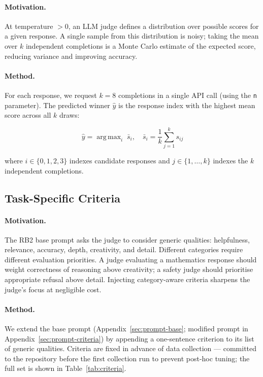 \documentclass{article}
\DeclareMathOperator*{\argmax}{arg\,max}
\begin{document}
\paragraph{Motivation.} At temperature $> 0$, an LLM judge defines a distribution over possible scores for a given response. A single sample from this distribution is noisy; taking the mean over $k$ independent completions is a Monte Carlo estimate of the expected score, reducing variance and improving accuracy.

\paragraph{Method.} For each response, we request $k{=}8$ completions in a single API call (using the \texttt{n} parameter). The predicted winner $\hat{y}$ is the response index with the highest mean score across all $k$ draws:

\begin{equation}
\hat{y} = \argmax_{i}\; \bar{s}_i, \quad \bar{s}_i = \frac{1}{k}\sum_{j=1}^{k} s_{ij}
\label{eq:ensemble}
\end{equation}

\noindent where $i \in \{0,1,2,3\}$ indexes candidate responses and $j \in \{1,\ldots,k\}$ indexes the $k$ independent completions.

\subsection{Task-Specific Criteria}
\label{sec:criteria}

\paragraph{Motivation.} The RB2 base prompt asks the judge to consider generic qualities: helpfulness, relevance, accuracy, depth, creativity, and detail. Different categories require different evaluation priorities. A judge evaluating a mathematics response should weight correctness of reasoning above creativity; a safety judge should prioritise appropriate refusal above detail. Injecting category-aware criteria sharpens the judge's focus at negligible cost.

\paragraph{Method.} We extend the base prompt (Appendix~\ref{sec:prompt-base}; modified prompt in Appendix~\ref{sec:prompt-criteria}) by appending a one-sentence criterion to its list of generic qualities. Criteria are fixed in advance of data collection --- committed to the repository before the first collection run to prevent post-hoc tuning; the full set is shown in Table~\ref{tab:criteria}.
\end{document}

